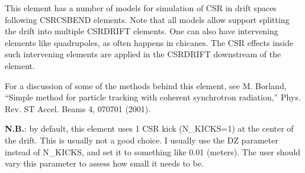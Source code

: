 This element has a number of models for simulation of CSR in drift
spaces following CSRCSBEND elements.  Note that all models allow
support splitting the drift into multiple CSRDRIFT elements.
One can also have intervening elements like quadrupoles,
as often happens in chicanes.  The CSR effects inside such
intervening elements are applied in the CSRDRIFT downstream of
the element.

For a discussion of some of the methods behind this element, see
M. Borland, ``Simple method for particle tracking with coherent
synchrotron radiation,'' Phys. Rev. ST Accel. Beams 4, 070701 (2001).

{\bf N.B.}: by default, this element uses 1 CSR kick (N\_KICKS=1) at the
center of the drift.  This is usually not a good choice.  I usually
use the DZ parameter instead of N\_KICKS, and set it to something
like 0.01 (meters).  The user should vary this parameter to assess
how small it needs to be.


